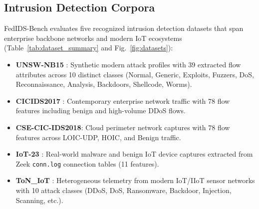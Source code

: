 \documentclass[conference]{IEEEtran}
\begin{document}
\subsection{Intrusion Detection Corpora}
FedIDS-Bench evaluates five recognized intrusion detection datasets that span enterprise backbone networks and modern IoT ecosystems (Table~\ref{tab:dataset_summary} and Fig.~\ref{fig:datasets}):
\begin{itemize}
    \item \textbf{UNSW-NB15} \cite{moustafa2015unsw}: Synthetic modern attack profiles with 39 extracted flow attributes across 10 distinct classes (Normal, Generic, Exploits, Fuzzers, DoS, Reconnaissance, Analysis, Backdoors, Shellcode, Worms).
    \item \textbf{CICIDS2017} \cite{sharafaldin2018toward}: Contemporary enterprise network traffic with 78 flow features including benign and high-volume DDoS flows.
    \item \textbf{CSE-CIC-IDS2018}: Cloud perimeter network captures with 78 flow features across LOIC-UDP, HOIC, and Benign traffic.
    \item \textbf{IoT-23} \cite{garcia2020iot23}: Real-world malware and benign IoT device captures extracted from Zeek \texttt{conn.log} connection tables (11 features).
    \item \textbf{ToN\_IoT} \cite{alsaedi2020ton}: Heterogeneous telemetry from modern IoT/IIoT sensor networks with 10 attack classes (DDoS, DoS, Ransomware, Backdoor, Injection, Scanning, etc.).
\end{itemize}

\begin{table}[htbp]
\caption{Intrusion Detection Telemetry Corpora Profile}
\label{tab:dataset_summary}
\centering
{}
\end{table}
\end{document}
